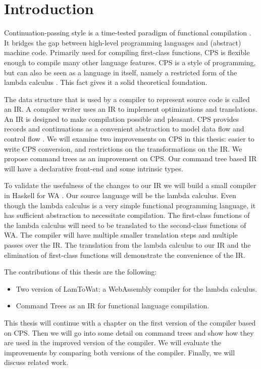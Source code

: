 
\chapter{\label{chap:introduction}Introduction}

Continuation-passing style is a time-tested paradigm of functional compilation \autocite{steele1978rabbit, DBLP:books/daglib/0022396}. It bridges the gap between high-level programming languages and (abstract) machine code. Primarily used for compiling first-class functions, \ac{CPS} is flexible enough to compile many other language features. \ac{CPS} is a style of programming, but can also be seen as a language in itself, namely a restricted form of the lambda calculus \autocite{barendregt1984lambda}. This fact gives it a solid theoretical foundation.

The data structure that is used by a compiler to represent source code is called an \ac{IR}. A compiler writer uses an \ac{IR} to implement optimizations and translations. An \ac{IR} is designed to make compilation possible and pleasant. \ac{CPS} provides records and continuations as a convenient abstraction to model data flow and control flow \autocite{bruin2020framevm}. We will examine two improvements on \ac{CPS} in this thesis: easier to write \ac{CPS} conversion, and restrictions on the transformations on the \ac{IR}. We propose command trees \autocite{commandtreespoulsen} as an improvement on \ac{CPS}. Our command tree based \ac{IR} will have a declarative front-end and some intrinsic types.

To validate the usefulness of the changes to our \ac{IR} we will build a small compiler in Haskell \autocite{haskellhomepage} for \ac{WA} \autocite{webassemblyhomepage}. Our source language will be the lambda calculus. Even though the lambda calculus is a very simple functional programming language, it has sufficient abstraction to necessitate compilation. The first-class functions of the lambda calculus will need to be translated to the second-class functions of \ac{WA}. The compiler will have multiple smaller translation steps and multiple passes over the \ac{IR}. The translation from the lambda calculus to our \ac{IR} and the elimination of first-class functions will demonstrate the convenience of the \ac{IR}.

The contributions of this thesis are the following:
\begin{itemize}
\item Two version of LamToWat: a WebAssembly compiler for the lambda calculus.
\item Command Trees as an \ac{IR} for functional language compilation.
\end{itemize}

This thesis will continue with a chapter on the first version of the compiler based on \ac{CPS}. Then we will go into some detail on command trees and show how they are used in the improved version of the compiler. We will evaluate the improvements by comparing both versions of the compiler. Finally, we will discuss related work.